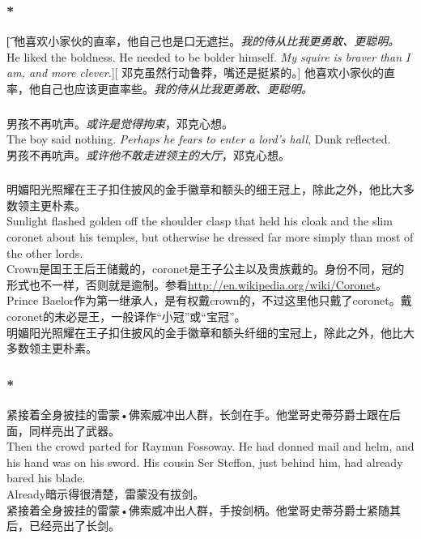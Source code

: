 \documentclass[12pt,a4paper]{article}
\newcommand{\h}[1]{{\color{red}#1}\\}
\newcommand{\la}[1]{{\color{blue}#1}\\}
\begin{document}
\subsubsection{\color{red}*}\t[
	他喜欢小家伙的直率，他自己也是口无遮拦。\emph{我的侍从比我更勇敢、更聪明。}\\
	He liked the boldness. He needed to be bolder himself. \emph{My squire is braver than I am, and more clever.}][
	邓克虽然行动鲁莽，嘴还是挺紧的。]
	他喜欢小家伙的直率，他自己也应该更直率些。\emph{我的侍从比我更勇敢、更聪明。}
	
\subsubsection{}\la{
	男孩不再吭声。\emph{或许是觉得拘束}，邓克心想。\\
	The boy said nothing. \emph{Perhaps he fears to enter a lord's hall}, Dunk reflected. }
	男孩不再吭声。\emph{或许他不敢走进领主的大厅}，邓克心想。
	
\subsubsection{}\la{
	 明媚阳光照耀在王子扣住披风的金手徽章和额头的细王冠上，除此之外，他比大多数领主更朴素。\\
	 Sunlight flashed golden off the shoulder clasp that held his cloak and the slim coronet about his temples, but otherwise he dressed far more simply than most of the other lords.}\h{
	 Crown是国王王后王储戴的，coronet是王子公主以及贵族戴的。身份不同，冠的形式也不一样，否则就是逾制。参看\url{http://en.wikipedia.org/wiki/Coronet}。Prince Baelor作为第一继承人，是有权戴crown的，不过这里他只戴了coronet。戴coronet的未必是王，一般译作“小冠”或“宝冠”。}
	 明媚阳光照耀在王子扣住披风的金手徽章和额头纤细的宝冠上，除此之外，他比大多数领主更朴素。
	 
\subsubsection{\color{red}*}\la{
	紧接着全身披挂的雷蒙•佛索威冲出人群，长剑在手。他堂哥史蒂芬爵士跟在后面，同样亮出了武器。\\
	Then the crowd parted for Raymun Fossoway. He had donned mail and helm, and his hand was on his sword. His cousin Ser Steffon, just behind him, had already bared his blade.}\h{
	Already暗示得很清楚，雷蒙没有拔剑。}
	紧接着全身披挂的雷蒙•佛索威冲出人群，手按剑柄。他堂哥史蒂芬爵士紧随其后，已经亮出了长剑。
	
\end{document}
